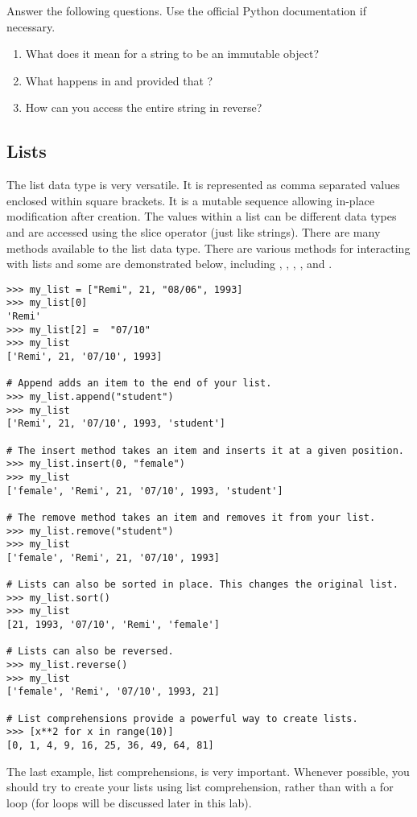 \begin{problem}
Answer the following questions. Use the official Python documentation if necessary.
\begin{enumerate}
\item What does it mean for a string to be an immutable object? 
\item What happens in  and  provided 
that ? 
\item How can you access the entire string in reverse?
\end{enumerate}
\end{problem}

\subsection*{Lists}
\begin{example}
The list data type is very versatile. 
It is represented as comma separated values enclosed within square brackets. 
It is a mutable sequence allowing in-place modification after creation. 
The values within a list can be different data types and are accessed using the 
slice operator (just like strings). There are many methods available to the list data type. 
There are various methods for interacting with lists and some are demonstrated below, including , , , , and .

\begin{lstlisting}
>>> my_list = ["Remi", 21, "08/06", 1993]
>>> my_list[0]
'Remi'
>>> my_list[2] =  "07/10"
>>> my_list
['Remi', 21, '07/10', 1993]

# Append adds an item to the end of your list.
>>> my_list.append("student")
>>> my_list
['Remi', 21, '07/10', 1993, 'student']

# The insert method takes an item and inserts it at a given position. 
>>> my_list.insert(0, "female")
>>> my_list
['female', 'Remi', 21, '07/10', 1993, 'student']

# The remove method takes an item and removes it from your list.
>>> my_list.remove("student")
>>> my_list
['female', 'Remi', 21, '07/10', 1993]

# Lists can also be sorted in place. This changes the original list.
>>> my_list.sort()
>>> my_list
[21, 1993, '07/10', 'Remi', 'female']

# Lists can also be reversed.
>>> my_list.reverse()
>>> my_list
['female', 'Remi', '07/10', 1993, 21]

# List comprehensions provide a powerful way to create lists. 
>>> [x**2 for x in range(10)]
[0, 1, 4, 9, 16, 25, 36, 49, 64, 81]

\end{lstlisting}
The last example, list comprehensions, is very important. Whenever possible, you should try to create your lists using list comprehension, rather than with a for loop (for loops will be discussed later in this lab).
\label{exp:lists}
\end{example}

